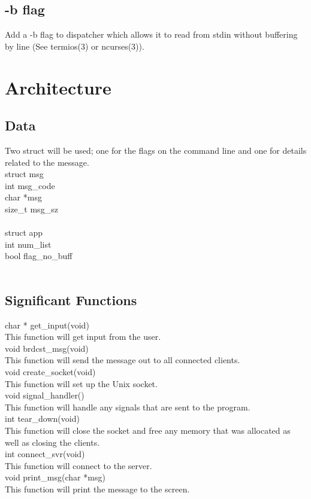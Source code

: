 \documentclass{article}
\begin{document}
  \subsection*{-b flag}
  Add a -b flag to dispatcher which allows it to read from stdin without buffering
  by line (See termios(3) or ncurses(3)).

  \section*{Architecture}
  \subsection*{Data}
Two struct will be used; one for the flags on the command line and one for details related to the message.\\
struct msg{\\
\qquad \indent int msg\_code\\
\qquad \indent char *msg\\
\qquad \indent size\_t msg\_sz\\
}\\
struct app{\\
\qquad \indent int num\_list\\
\qquad \indent bool flag\_no\_buff\\
}\\
  \subsection*{Significant Functions}
  char * get\_input(void)\\
  \qquad \indent This function will get input from the user.\\
  void brdcst\_msg(void)\\
  \qquad \indent This function will send the message out to all connected clients.\\
  void create\_socket(void)\\
  \qquad \indent This function will set up the Unix socket.\\
  void signal\_handler()\\
  \qquad \indent This function will handle any signals that are sent to the program.\\
  int tear\_down(void)\\
  \qquad \indent This function will close the socket and free any memory that was allocated as well as closing
  the clients.\\
  int connect\_svr(void)\\
  \qquad \indent This function will connect to the server.\\
  void print\_msg(char *msg)\\
  \qquad \indent This function will print the message to the screen.\\
\end{document}

